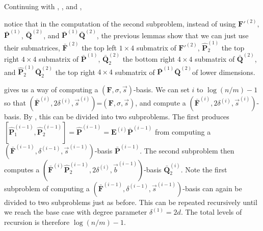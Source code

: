 \begin{exmp}
Continuing with , ,
and , %
\begin{comment}
notice that after the first subproblem, the second subproblem of computing
$\bar{\mathbf{Q}}^{(2)}$ in \prettyref{exm:subproblems} is really
a smaller problem of computing the lower right $4\times4$ submatrix
$\bar{\mathbf{Q}}_{2}^{(2)}$, which is a $(\bar{\mathbf{F}}^{\left(2\right)}\hat{\mathbf{P}}_{2}^{\left(1\right)},8,\vec{b}^{\left(1\right)})$-basis
(or equivalently a $(\mathbf{F}'^{\left(2\right)}\bar{\mathbf{P}}_{2}^{\left(1\right)},[8,4,4],\vec{b}^{\left(1\right)})$-basis),
where $\bar{\mathbf{P}}_{2}^{\left(1\right)}$ is the last $4$ columns
of $\bar{\mathbf{P}}^{(1)}$, $\vec{b}^{(1)}=[2,3,3,3]$ is the list
of column degrees of $\bar{\mathbf{P}}_{2}^{(1)}$, and $\hat{\mathbf{P}}_{2}^{\left(1\right)}$
is the first $4$ rows of $\bar{\mathbf{P}}_{2}^{(1)}$. 
\end{comment}
{}notice that in the computation of the second subproblem, instead of
using $\mathbf{F}'^{\left(2\right)},$ $\bar{\mathbf{P}}^{\left(1\right)}$,
$\bar{\mathbf{Q}}^{(2)}$, and $\bar{\mathbf{P}}^{(1)}\bar{\mathbf{Q}}^{(2)}$,
the previous lemmas show that we can just use their submatrices, $\bar{\mathbf{F}}^{(2)}$
the top left $1\times4$ submatrix of $\mathbf{F}'^{\left(2\right)}$,
$\hat{\mathbf{P}}_{2}^{(1)}$ the top right $4\times4$ submatrix
of $\bar{\mathbf{P}}^{(1)}$, $\bar{\mathbf{Q}}_{2}^{(2)}$ the bottom
right $4\times4$ submatrix of $\bar{\mathbf{Q}}^{(2)}$, and $\hat{\mathbf{P}}_{2}^{(1)}\bar{\mathbf{Q}}_{2}^{(2)}$
the top right $4\times4$ submatrix of $\bar{\mathbf{P}}^{(1)}\bar{\mathbf{Q}}^{(2)}$of
lower dimensions. 
\end{exmp}
 gives us a way of computing
a $\left(\mathbf{F},\sigma,\vec{s}\right)$-basis. We can set $i$
to $\log\left(n/m\right)-1$ so that $(\bar{\mathbf{F}}^{\left(i\right)},2\delta^{\left(i\right)},\vec{s}^{\left(i\right)})$=$\left(\mathbf{F},\sigma,\vec{s}\right)$,
and compute a $(\bar{\mathbf{F}}^{\left(i\right)},2\delta^{\left(i\right)},\vec{s}^{\left(i\right)})$-basis.
By , this can be divided into
two subproblems. The first produces $[\hat{\mathbf{P}}_{1}^{\left(i-1\right)},\hat{\mathbf{P}}_{2}^{\left(i-1\right)}]=\hat{\mathbf{P}}^{\left(i-1\right)}=\mathbf{E}^{\left(i\right)}\bar{\mathbf{P}}^{\left(i-1\right)}$
from computing a $(\bar{\mathbf{F}}^{\left(i-1\right)},\delta^{\left(i-1\right)},\vec{s}^{\left(i-1\right)})$-basis
$\bar{\mathbf{P}}^{\left(i-1\right)}$. The second subproblem then
computes a $(\bar{\mathbf{F}}^{\left(i\right)}\hat{\mathbf{P}}_{2}^{\left(i-1\right)},2\delta^{\left(i\right)},\vec{b}^{\left(i-1\right)})$-basis
$\bar{\mathbf{Q}}_{2}^{\left(i\right)}$. Note the first subproblem
of computing a $(\bar{\mathbf{F}}^{\left(i-1\right)},\delta^{\left(i-1\right)},\vec{s}^{\left(i-1\right)})$-basis
can again be divided to two subproblems just as before. This can be
repeated recursively until we reach the base case with degree parameter
$\delta^{\left(1\right)}=2d$. The total levels of recursion is therefore
$\log\left(n/m\right)-1$.

